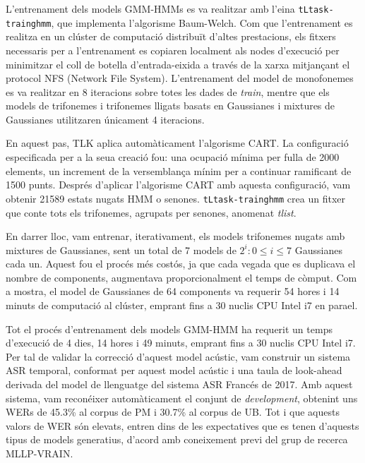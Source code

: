 L'entrenament dels models GMM-HMMs es va realitzar amb l'eina \texttt{tLtask-trainghmm}, que implementa l'algorisme Baum-Welch.
Com que l'entrenament es realitza en un clúster de computació distribuït d'altes prestacions, els fitxers necessaris per a l'entrenament es copiaren localment als nodes d'execució per minimitzar el coll de botella d'entrada-eixida a través de la xarxa mitjançant el protocol NFS (Network File System).
L'entrenament del model de monofonemes es va realitzar en 8 iteracions sobre totes les dades de \textit{train}, mentre que els models de trifonemes i trifonemes lligats basats en Gaussianes i mixtures de Gaussianes utilitzaren únicament 4 iteracions.

En aquest pas, TLK aplica automàticament l'algorisme CART. La configuració especificada per a la seua creació fou: una ocupació mínima per fulla de 2000 elements, un increment de la versemblança mínim per a continuar ramificant de 1500 punts.
Després d'aplicar l'algorisme CART amb aquesta configuració, vam obtenir 21589 estats nugats HMM o senones.
\texttt{tLtask-trainghmm} crea un fitxer que conte tots els trifonemes, agrupats per senones, anomenat \textit{tlist}.


En darrer lloc, vam entrenar, iterativament, els models trifonemes nugats amb mixtures de Gaussianes, sent un total de 7 models de $2^i : 0 \leq i \leq 7$ Gaussianes cada un. Aquest fou el procés més costós, ja que cada vegada que es duplicava el nombre de components, augmentava proporcionalment el temps de còmput. Com a mostra, el model de Gaussianes de 64 components va requerir 54 hores i 14 minuts de computació al clúster, emprant fins a 30 nuclis CPU Intel i7 en para\lgem el. 

Tot el procés d'entrenament dels models GMM-HMM ha requerit un temps d'execució de 4 dies, 14 hores i 49 minuts, emprant fins a 30 nuclis CPU Intel i7.
Per tal de validar la correcció d'aquest model acústic, vam construir un sistema ASR temporal, conformat per aquest model acústic i una taula de look-ahead derivada del model de llenguatge del sistema ASR Francés de 2017. Amb aquest sistema, vam reconéixer automàticament el conjunt de \textit{development}, obtenint uns WERs de 45.3\% al corpus de PM i 30.7\% al corpus de UB.
Tot i que aquests valors de WER són elevats, entren dins de les expectatives que es tenen d'aquests tipus de models generatius, d'acord amb coneixement previ del grup de recerca MLLP-VRAIN.

